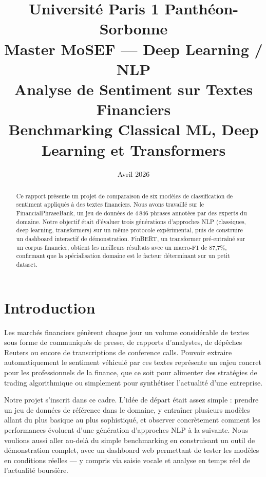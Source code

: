 \documentclass[12pt, a4paper]{article}
\title{
  \vspace{-1cm}
  {\large Université Paris 1 Panthéon-Sorbonne}\\
  {\large Master MoSEF --- Deep Learning / NLP}\\[1cm]
  {\LARGE\bfseries\color{paris1blue} Analyse de Sentiment sur Textes Financiers}\\[0.3cm]
  {\large Benchmarking Classical ML, Deep Learning et Transformers}
}
\author{}
\date{Avril 2026}
\begin{document}
\maketitle
\thispagestyle{empty}

\begin{abstract}
Ce rapport présente un projet de comparaison de six modèles de classification
de sentiment appliqués à des textes financiers. Nous avons travaillé sur le
FinancialPhraseBank, un jeu de données de 4\,846 phrases annotées par des experts
du domaine. Notre objectif était d'évaluer trois générations d'approches NLP
(classiques, deep learning, transformers) sur un même protocole expérimental,
puis de construire un dashboard interactif de démonstration. FinBERT, un
transformer pré-entraîné sur un corpus financier, obtient les meilleurs résultats
avec un macro-F1 de 87,7\%, confirmant que la spécialisation domaine est le facteur
déterminant sur un petit dataset.
\end{abstract}

\newpage
\tableofcontents
\newpage

\section{Introduction}

Les marchés financiers génèrent chaque jour un volume considérable de textes sous
forme de communiqués de presse, de rapports d'analystes, de dépêches Reuters ou
encore de transcriptions de conference calls. Pouvoir extraire automatiquement le
sentiment véhiculé par ces textes représente un enjeu concret pour les professionnels
de la finance, que ce soit pour alimenter des stratégies de trading algorithmique ou
simplement pour synthétiser l'actualité d'une entreprise.

Notre projet s'inscrit dans ce cadre. L'idée de départ était assez simple : prendre
un jeu de données de référence dans le domaine, y entraîner plusieurs modèles allant
du plus basique au plus sophistiqué, et observer concrètement comment les performances
évoluent d'une génération d'approches NLP à la suivante. Nous voulions aussi aller
au-delà du simple benchmarking en construisant un outil de démonstration complet, avec
un dashboard web permettant de tester les modèles en conditions réelles --- y compris
via saisie vocale et analyse en temps réel de l'actualité boursière.
\end{document}
